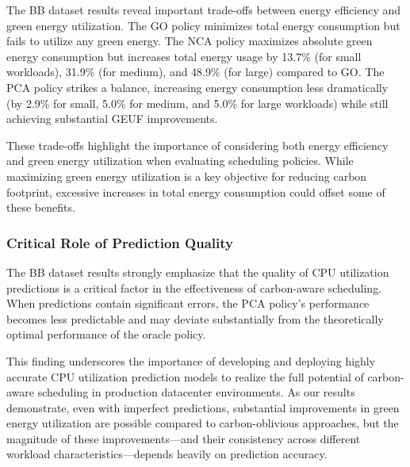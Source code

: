 The BB dataset results reveal important trade-offs between energy efficiency and green energy utilization. The GO policy minimizes total energy consumption but fails to utilize any green energy. The NCA policy maximizes absolute green energy consumption but increases total energy usage by 13.7\% (for small workloads), 31.9\% (for medium), and 48.9\% (for large) compared to GO. The PCA policy strikes a balance, increasing energy consumption less dramatically (by 2.9\% for small, 5.0\% for medium, and 5.0\% for large workloads) while still achieving substantial GEUF improvements.

These trade-offs highlight the importance of considering both energy efficiency and green energy utilization when evaluating scheduling policies. While maximizing green energy utilization is a key objective for reducing carbon footprint, excessive increases in total energy consumption could offset some of these benefits.

\subsubsection{Critical Role of Prediction Quality}

The BB dataset results strongly emphasize that the quality of CPU utilization predictions is a critical factor in the effectiveness of carbon-aware scheduling. When predictions contain significant errors, the PCA policy's performance becomes less predictable and may deviate substantially from the theoretically optimal performance of the oracle policy.

This finding underscores the importance of developing and deploying highly accurate CPU utilization prediction models to realize the full potential of carbon-aware scheduling in production datacenter environments. As our results demonstrate, even with imperfect predictions, substantial improvements in green energy utilization are possible compared to carbon-oblivious approaches, but the magnitude of these improvements—and their consistency across different workload characteristics—depends heavily on prediction accuracy.